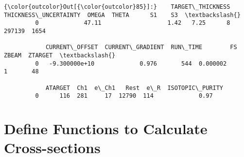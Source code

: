 \documentclass[11pt]{article}
\begin{document}
\begin{Verbatim}[commandchars=\\\{\}]
{\color{outcolor}Out[{\color{outcolor}85}]:}    TARGET\_THICKNESS  THICKNESS\_UNCERTAINTY  OMEGA  THETA      S1    S3  \textbackslash{}
         0             47.11                   1.42   7.25      8  297139  1654   
         
            CURRENT\_OFFSET  CURRENT\_GRADIENT  RUN\_TIME        FS  ZBEAM  ZTARGET  \textbackslash{}
         0   -9.300000e+10             0.976       544  0.000002      1       48   
         
            ATARGET  Ch1  e\_Ch1   Rest  e\_R  ISOTOPIC\_PURITY  
         0      116  281     17  12790  114             0.97  
\end{Verbatim}
            
    \section{Define Functions to Calculate
Cross-sections}\label{define-functions-to-calculate-cross-sections}
\end{document}
